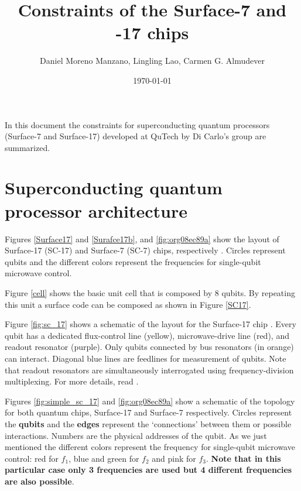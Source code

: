 \documentclass[11pt]{article}
\author{Daniel Moreno Manzano, Lingling Lao, Carmen G. Almudever}
\date{\today}
\title{Constraints of the Surface-7 and -17 chips}
\begin{document}
\maketitle


In this document the constraints for superconducting quantum processors (Surface-7 and Surface-17) developed at QuTech by Di Carlo's group are summarized. 



\section{Superconducting quantum processor architecture}
\label{sec:topology}

Figures \ref{Surface17}  and \ref{Surafce17b}, and \ref{fig:org08ec89a}  show the layout of Surface-17 (SC-17) and Surface-7 (SC-7) chips, respectively \cite{versluis2016scalable}. Circles represent qubits and the different colors represent the frequencies for single-qubit microwave control.

Figure \ref{cell} shows the basic unit cell that is composed by 8 qubits. By repeating this unit a surface code can be composed as shown in Figure \ref{SC17}. 

Figure \ref{fig:sc_17} shows a schematic of the layout for the Surface-17 chip \cite{versluis2016scalable}. Every qubit has a dedicated flux-control line (yellow), microwave-drive line (red), and readout resonator (purple). Only qubits connected by bus resonators (in orange) can interact. Diagonal blue lines are feedlines for measurement of qubits. Note that readout resonators are simultaneously interrogated using frequency-division multiplexing. For more details, read \cite{versluis2016scalable,versluis2017scalable}. 


Figures \ref{fig:simple_sc_17} and \ref{fig:org08ec89a}  show a schematic of the topology for both quantum chips, Surface-17 and Surface-7 respectively. Circles represent the \textbf{qubits}  and the \textbf{edges} represent the `connections' between them or possible interactions. Numbers  are the physical addresses of the qubit. As we just mentioned the different colors represent the frequency for single-qubit microwave control: red for $f_1$, blue and green for $f_2$ and pink for $f_3$. \textbf{Note that in this particular case only 3 frequencies are used but 4 different frequencies are also possible}.%
\end{document}

